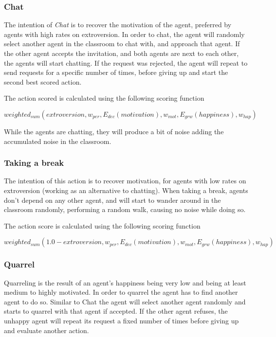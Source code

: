\subsubsection{Chat}
The intention of \textit{Chat} is to recover the motivation of the agent, preferred
by agents with high rates on extroversion. In order to chat, the agent will
randomly select another agent in the classroom to chat with, and approach that agent.
If the other agent accepts the invitation, and both agents are next to each other,
the agents will start chatting. If the request was rejected, the agent will repeat
to send requests for a specific number of times, before giving up and start the second
best scored action.

The action scored is calculated using the following scoring function

\begin{equation}
    weighted_{sum}(extroversion, w_{per}, E_{dec}(motivation), w_{mot}, E_{grw}(happiness), w_{hap})
\end{equation}

While the agents are chatting, they will produce a bit of noise adding the
accumulated noise in the classroom.

\subsubsection{Taking a break}
The intention of this action is to recover motivation, for agents
with low rates on extroversion (working as an alternative to chatting).
When taking a break, agents don't depend on any other agent, and will start to
wander around in the classroom randomly, performing a random walk, causing no noise
while doing so.

The action score is calculated using the following scoring function

\begin{equation}
    weighted_{sum}(1.0 - extroversion, w_{per}, E_{dec}(motivation), w_{mot}, E_{grw}(happiness), w_{hap})
\end{equation}

\subsubsection{Quarrel}
Quarreling is the result of an agent's happiness being very low and being at least
medium to highly motivated. In order to quarrel the agent has to find another agent
to do so. Similar to Chat the agent will select another agent randomly and starts
to quarrel with that agent if accepted. If the other agent refuses, the unhappy
agent will repeat its request a fixed number of times before giving up and evaluate
another action.

